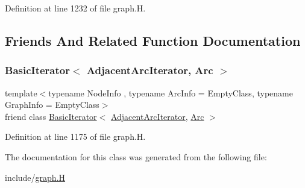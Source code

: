 Definition at line 1232 of file graph.\+H.



\subsection{Friends And Related Function Documentation}
\mbox{\label{class_designar_1_1_graph_1_1_adjacent_arc_iterator_a73ad70d76f3331ee4b07451db1347918}} 
\subsubsection{\texorpdfstring{Basic\+Iterator$<$ Adjacent\+Arc\+Iterator, Arc $>$}{BasicIterator< AdjacentArcIterator, Arc >}}
{\footnotesize\ttfamily template$<$typename Node\+Info , typename Arc\+Info  = Empty\+Class, typename Graph\+Info  = Empty\+Class$>$ \\
friend class \hyperlink{class_designar_1_1_basic_iterator}{Basic\+Iterator}$<$ \hyperlink{class_designar_1_1_graph_1_1_adjacent_arc_iterator}{Adjacent\+Arc\+Iterator}, \hyperlink{class_designar_1_1_graph_a74c730ef4ce2d20f998d72bd25c2b5bf}{Arc} $>$\hspace{0.3cm}{\ttfamily [friend]}}



Definition at line 1175 of file graph.\+H.



The documentation for this class was generated from the following file\+:\begin{DoxyCompactItemize}
\item 
include/\hyperlink{graph_8_h}{graph.\+H}\end{DoxyCompactItemize}
